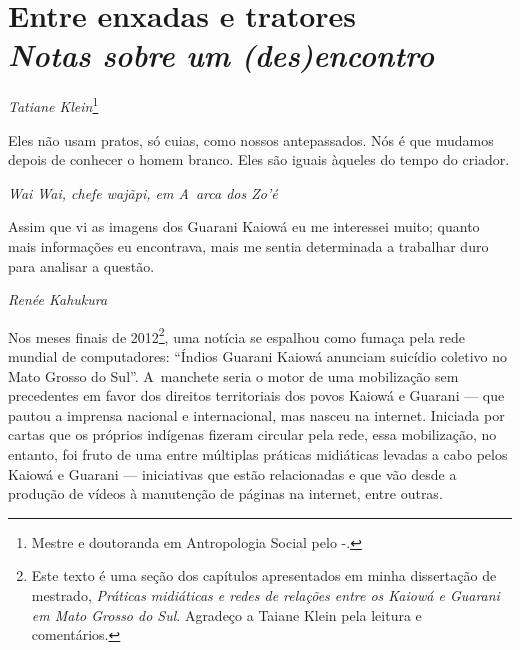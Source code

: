 \thispagestyle{empty}

\chapter*{Entre enxadas e tratores\\ 
\large{\emph{Notas sobre um (des)encontro}}}


\begin{flushright}
\emph{Tatiane Klein}\footnote{Mestre e doutoranda em Antropologia Social pelo
-.}
\end{flushright}

\epigraph{Eles não usam pratos, só cuias, como nossos antepassados. Nós é que
mudamos depois de conhecer o homem branco. Eles são iguais àqueles do
tempo do criador.}{\emph{Wai Wai, chefe wajãpi, em \emph{A~arca dos Zo’é}}}

\begin{samepage}
\epigraph{Assim que vi as imagens dos Guarani Kaiowá eu me interessei muito;
quanto mais informações eu encontrava, mais me sentia determinada a
trabalhar duro para analisar a questão.\footnotemark[2]}{\emph{Renée Kahukura}\footnotemark[3]}
\nopagebreak
\noindent Nos meses finais de 2012\footnote[4]{Este texto é uma seção dos capítulos
apresentados em minha dissertação de mestrado, \emph{Práticas midiáticas e
redes de relações entre os Kaiowá e Guarani em Mato Grosso do Sul}.
Agradeço a Taiane Klein pela leitura e comentários.}, uma notícia se
espalhou como fumaça pela rede mundial de computadores: ``Índios Guarani
Kaiowá anunciam suicídio coletivo no Mato Grosso do Sul''. A~manchete
seria o motor de uma mobilização sem precedentes em favor dos direitos
territoriais dos povos Kaiowá e Guarani --- que pautou a imprensa
nacional e internacional, mas nasceu na internet. Iniciada por cartas
que os próprios indígenas fizeram circular pela rede, essa mobilização,
no entanto, foi fruto de uma entre múltiplas práticas midiáticas
levadas a cabo pelos Kaiowá e Guarani --- iniciativas que estão
relacionadas e que vão desde a produção de vídeos à manutenção de
páginas na internet, entre outras. 
\end{samepage}

